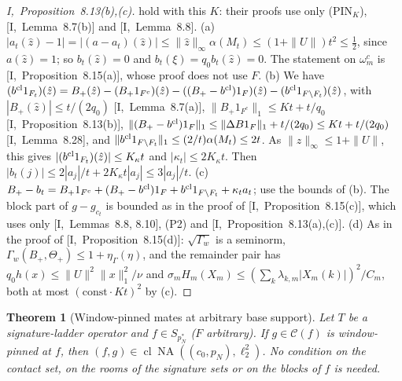 \documentclass[10pt]{amsart}
\newtheorem{theorem}{Theorem}[section]
\theoremstyle{definition}
\theoremstyle{remark}
\newcommand{\NA}{\operatorname{NA}}
\newcommand{\Cset}{\mathcal C}
\newcommand{\cl}{\operatorname{cl}}
\newcommand{\zh}{\hat z}
\begin{document}
\begin{proof}
[I,~Proposition~8.13(b),(c)] hold with this $K$: their proofs use only
(PIN$_K$), [I,~Lemma~8.7(b)] and [I,~Lemma~8.8].
(a) $|a_t(\zh)-1|=|(a-a_t)(\zh)|\le\|\zh\|_\infty\alpha(M_t)\le(1+\|U\|)t^2
\le\frac12$, since $a(\zh)=1$; so $b_t(\zh)=0$ and $b_t(\xi)=q_0b_t(\zh)=0$.
The statement on $\omega^c_m$ is [I,~Proposition~8.15(a)], whose proof does
not use $F$.
(b) We have $(b^{\rm cl}1_{F_t})(\zh)=B_+(\zh)-(B_+1_{F^c})(\zh)-((B_+-
b^{\rm cl})1_F)(\zh)-(b^{\rm cl}1_{F\setminus F_t})(\zh)$, with
$|B_+(\zh)|\le t/(2q_0)$ [I,~Lemma~8.7(a)], $\|B_+1_{F^c}\|_1\le Kt+t/q_0$
[I,~Proposition~8.13(b)], $\|(B_+-b^{\rm cl})1_F\|_1\le\|\Delta B1_F\|_1+
t/(2q_0)\le Kt+t/(2q_0)$ [I,~Lemma~8.28], and $\|b^{\rm cl}1_{F\setminus
F_t}\|_1\le(2/t)\alpha(M_t)\le2t$.  As $\|\zh\|_\infty\le1+\|U\|$, this gives
$|(b^{\rm cl}1_{F_t})(\zh)|\le K_\kappa t$ and $|\kappa_t|\le2K_\kappa t$.  Then
$|b_t(j)|\le2|a_j|/t+2K_\kappa t|a_j|\le3|a_j|/t$.
(c) $B_+-b_t=B_+1_{F^c}+(B_+-b^{\rm cl})1_F+b^{\rm cl}1_{F\setminus F_t}+
\kappa_ta_t$; use the bounds of (b).  The block part of $g-g_{c_t}$ is bounded
as in the proof of [I,~Proposition~8.15(c)], which uses only
[I,~Lemmas~8.8, 8.10], (P2) and [I,~Proposition~8.13(a),(c)].
(d) As in the proof of [I,~Proposition~8.15(d)]: $\sqrt{\Gamma_w}$ is a
seminorm, $\Gamma_w(B_+,\Theta_+)\le1+\eta_\Gamma(\eta)$, and the remainder
pair has $q_0h(x)\le\|U\|^2\|x\|_1^2/\nu$ and $\sigma_mH_m(X_m)\le(\sum_k
\lambda_{k,m}|X_m(k)|)^2/C_m$, both at most $(\text{const}\cdot Kt)^2$ by (c).
\end{proof}

\begin{theorem}[Window-pinned mates at arbitrary base support]
\label{thm:II-Bstarinf}
Let $T$ be a signature-ladder operator and $f\in S_{p_N^*}$ \textup{(}$F$
arbitrary\textup{)}.  If $g\in\Cset(f)$ is window-pinned at $f$, then
$(f,g)\in\cl\NA((c_0,p_N),\ell_2^2)$.  No condition on the contact set, on
the rooms of the signature sets or on the blocks of $f$ is needed.
\end{theorem}
\end{document}
